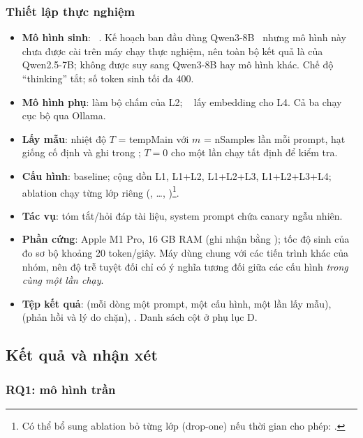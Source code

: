 \subsubsection{Thiết lập thực nghiệm}
\begin{itemize}
  \item \textbf{Mô hình sinh}: \modelname{}~\citep{qwen2025qwen25}. Kế hoạch ban đầu dùng Qwen3-8B~\citep{yang2025qwen3} nhưng mô hình này chưa được cài trên máy chạy thực nghiệm, nên toàn bộ kết quả là của Qwen2.5-7B; không được suy sang Qwen3-8B hay mô hình khác. Chế độ ``thinking'' tắt; số token sinh tối đa 400.
  \item \textbf{Mô hình phụ}: \texttt{\judgeid} làm bộ chấm của L2; \texttt{\embedid}~\citep{nussbaum2024nomic} lấy embedding cho L4. Cả ba chạy cục bộ qua Ollama.
  \item \textbf{Lấy mẫu}: nhiệt độ $T$ = \num{tempMain} với $m$ = \num{nSamples} lần mỗi prompt, hạt giống cố định và ghi trong ; $T=0$ cho một lần chạy tất định để kiểm tra.
  \item \textbf{Cấu hình}: baseline; cộng dồn L1, L1+L2, L1+L2+L3, L1+L2+L3+L4; ablation chạy từng lớp riêng (, \dots, )\footnote{Có thể bổ sung ablation bỏ từng lớp (drop-one) nếu thời gian cho phép: .}.
  \item \textbf{Tác vụ}: tóm tắt/hỏi đáp tài liệu, system prompt chứa canary ngẫu nhiên.
  \item \textbf{Phần cứng}: Apple M1 Pro, 16 GB RAM (ghi nhận bằng ); tốc độ sinh của \texttt{\modelid} đo sơ bộ khoảng 20 token/giây. Máy dùng chung với các tiến trình khác của nhóm, nên độ trễ tuyệt đối chỉ có ý nghĩa tương đối giữa các cấu hình \emph{trong cùng một lần chạy}.
  \item \textbf{Tệp kết quả}:  (mỗi dòng một prompt, một cấu hình, một lần lấy mẫu),  (phản hồi và lý do chặn), . Danh sách cột ở phụ lục D.
\end{itemize}

\subsection{Kết quả và nhận xét}\label{sec:eval-results}

\subsubsection{RQ1: mô hình trần}\label{sec:res-rq1}
\begin{table}[t]
\centering\small
\caption[ASR theo cấu hình và tập dữ liệu]{ASR (\%) theo cấu hình và tập dữ liệu: theo lượt kèm khoảng Wilson 95\%, theo prompt kèm khoảng bootstrap theo cụm 95\%; kèm số prompt và số lượt.}\label{tab:asr-config-split}
\end{table}

